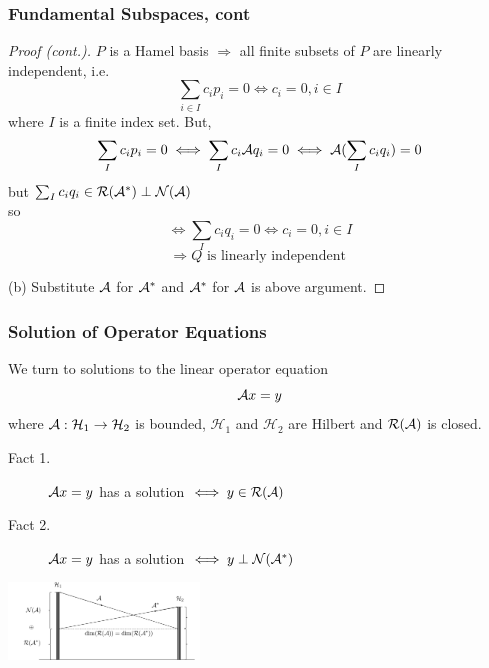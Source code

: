 \documentclass{beamer}
\begin{document}
\begin{frame}\frametitle{Fundamental Subspaces, cont}
	\begin{proof}[Proof (cont.)]
		$P$ is a Hamel basis $\Rightarrow$ all finite subsets of $P$ are linearly independent, i.e.
		\[ \sum_{i \in I} c_ip_i = 0 \iff c_i = 0, i \in I \]
		where $I$ is a finite index set.  But,
		\[ \sum_I c_ip_i = 0 \iff \sum_I c_i\mathcal{A} q_i = 0 \iff \mathcal{A}(\sum_I c_iq_i) = 0 \]
		but
		$ \sum_I c_i q_i \in \mathcal{R}(\mathcal{A}^\ast) \perp \mathcal{N}(\mathcal{A}) $\\
		so
		\[ \iff \sum_I c_i q_i = 0 \iff c_i = 0, i \in I \]
		\[ \Rightarrow Q \text{ is linearly independent } \]
		
		(b) Substitute $\mathcal{A}$ for $\mathcal{A}^\ast$ and $\mathcal{A}^\ast$ for $\mathcal{A}$ is above argument.

	\end{proof}
	
\end{frame}


\begin{frame}\frametitle{Solution of Operator Equations}
	We turn to solutions to the linear operator equation
	\[ \mathcal{A} x = y \]
	where $\mathcal{A}:\mathcal{H}_1 \to \mathcal{H}_2 $ is bounded, $\mathcal{H}_1$ and $\mathcal{H}_2$ are Hilbert and $\mathcal{R}(\mathcal{A})$ is closed.
	
		\begin{multicols}{2}
			\begin{description}
			\item[Fact 1.]	$\mathcal{A} x = y$ has a solution $\iff y \in \mathcal{R}(\mathcal{A}) $
			\item[Fact 2.] $\mathcal{A} x = y$ has a solution $\iff y \perp \mathcal{N}(\mathcal{A}^\ast)$
			\end{description}
 
			\columnbreak

			\begin{center}
				\includegraphics[width=2in]{figures/chap4_fundamental_subspaces}
			\end{center}	
		\end{multicols}

\end{frame}
\end{document}
